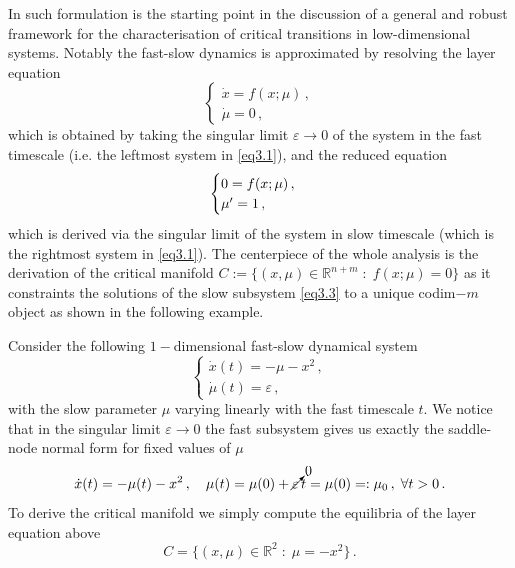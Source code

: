 \documentclass[../main.tex]{subfiles}
\begin{document}
In \cite{Kuehn11} such formulation is the starting point in the discussion of a general and robust framework for the characterisation of critical transitions in low-dimensional systems.
Notably the fast-slow dynamics is approximated by resolving the layer equation
\begin{equation}\label{eq3.2}
   \begin{cases}
           \dot{x}=f(x;\mu) \,, \\
           \dot{\mu}=0 \,, 
   \end{cases}
\end{equation}
which is obtained by taking the singular limit $\varepsilon\to0$ of the system in the fast timescale (i.e. the leftmost system in \eqref{eq3.1}), and the reduced equation
\begin{equation}\label{eq3.3}
   \begin{cases}
      0=f(x;\mu) \,, \\
      \mu'=1 \,, 
   \end{cases}
\end{equation}
which is derived via the singular limit of the system in slow timescale (which is the rightmost system in \eqref{eq3.1}).
The centerpiece of the whole analysis is the derivation of the critical manifold $C:=\{(x,\mu)\in \mathbb{R}^{n+m}\;:\;f(x;\mu)=0\}$ as it constraints the solutions of the slow subsystem \eqref{eq3.3} to a unique codim$-m$ object as shown in the following example.
\begin{example}[label=ex3.1]{}{}
     Consider the following $1-$dimensional fast-slow dynamical system
     \begin{equation*}
        \begin{cases}
            \dot{x}(t) = -\mu -x^{2}\,, \\
            \dot{\mu}(t) = \varepsilon \,, 
        \end{cases}
     \end{equation*}
     with the slow parameter $\mu$ varying linearly with the fast timescale $t$. 
     We notice that in the singular limit $\varepsilon\to0$ the fast subsystem gives us exactly the saddle-node normal form for fixed values of $\mu$
     \begin{equation*}
             \dot{x}(t) = -\mu(t) - x^{2}\,,\quad\mu(t)=\mu(0)+\cancelto{0}{\varepsilon}\,t=\mu(0)=:\mu_{0}\,,\;\forall t>0\,.
     \end{equation*}
    To derive the critical manifold we simply compute the equilibria of the layer equation above
    \begin{equation*}\label{eq}
            C=\{(x,\mu)\in \mathbb{R}^{2}\;:\; \mu=-x^{2}\}\,.
    \end{equation*}
\end{example}
\end{document}
